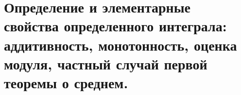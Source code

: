 \documentclass[../main.tex]{subfiles}
\begin{document}
\newpage
\section{Определение и элементарные свойства определенного интеграла: аддитивность, монотонность, оценка модуля, частный случай первой теоремы о среднем.}
\end{document}
